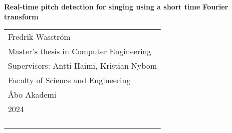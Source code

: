 
\begin{titlepage}
\vspace*{144pt}
\begin{center}
\Huge\bf Real-time pitch detection for singing using a short time Fourier transform 
\end{center}
\enlargethispage{3cm}
\vfill

\hfill
\begin{tabular}[t]{l@{}}%
Fredrik Wasström\\ 
Master's thesis in Computer Engineering\\ 
Supervisors: Antti Haimi, Kristian Nybom \\
Faculty of Science and Engineering \\
Åbo Akademi\\ 
2024\\ 
\\
\\
\\
\\
\end{tabular}
\end{titlepage}

